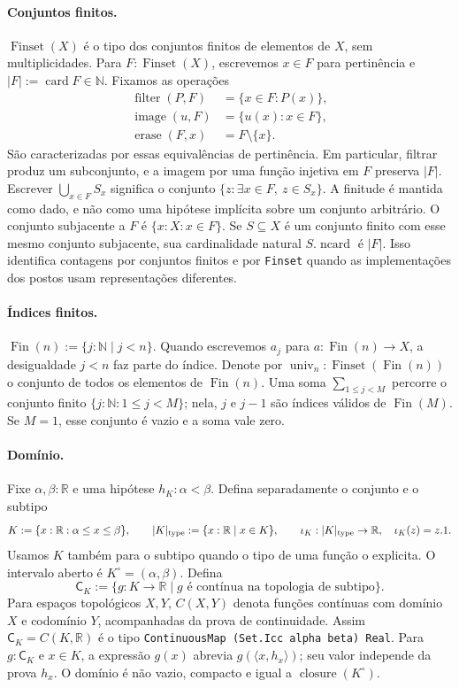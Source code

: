 \documentclass[11pt,a4paper]{article}
\newcommand{\N}{\mathbb N}
\newcommand{\R}{\mathbb R}
\newcommand{\CK}{\mathsf C_K}
\newcommand{\Fin}{\operatorname{Fin}}
\newcommand{\FS}{\operatorname{Finset}}
\newcommand{\card}{\operatorname{card}}
\newcommand{\cls}{\operatorname{closure}}
\newcommand{\code}[1]{\nolinkurl{#1}}
\begin{document}
\paragraph{Conjuntos finitos.}
$\FS(X)$ é o tipo dos conjuntos finitos de elementos de $X$, sem
multiplicidades. Para $F:\FS(X)$, escrevemos $x\in F$ para pertinência e
$|F|:=\card F\in\N$. Fixamos as operações
\begin{align*}
 \operatorname{filter}(P,F)&=\{x\in F:P(x)\},\\
 \operatorname{image}(u,F)&=\{u(x):x\in F\},\\
 \operatorname{erase}(F,x)&=F\setminus\{x\}.
\end{align*}
São caracterizadas por essas equivalências de pertinência. Em particular,
filtrar produz um subconjunto, e a imagem por uma função injetiva em $F$
preserva $|F|$. Escrever $\bigcup_{x\in F}S_x$ significa o conjunto
$\{z:\exists x\in F,\ z\in S_x\}$. A finitude é mantida como dado, e
não como uma hipótese implícita sobre um conjunto arbitrário.
O conjunto subjacente a $F$ é $\{x:X:x\in F\}$.
Se $S\subseteq X$ é um conjunto finito com esse mesmo conjunto
subjacente, sua cardinalidade natural $S.\operatorname{ncard}$ é $|F|$.
Isso identifica contagens por conjuntos finitos e por \code{Finset}
quando as implementações dos postos usam representações diferentes.

\paragraph{Índices finitos.}
$\Fin(n):=\{j:\N\mid j<n\}$. Quando escrevemos $a_j$ para
$a:\Fin(n)\to X$, a desigualdade $j<n$ faz parte do índice.
Denote por $\operatorname{univ}_n:\FS(\Fin(n))$ o conjunto de todos
os elementos de $\Fin(n)$. Uma soma $\sum_{1\le j<M}$ percorre o conjunto finito
$\{j:\N:1\le j<M\}$; nela, $j$ e $j-1$ são índices válidos de
$\Fin(M)$. Se $M=1$, esse conjunto é vazio e a soma vale zero.

\paragraph{Domínio.}
Fixe $\alpha,\beta:\R$ e uma hipótese $h_K:\alpha<\beta$.
Defina separadamente o conjunto e o subtipo
\[
 K:=\{x:\R:\alpha\le x\le\beta\},\qquad
 |K|_{\rm type}:=\{x:\R\mid x\in K\},\qquad
 \iota_K:|K|_{\rm type}\to\R,\quad\iota_K(z)=z.1.
\]
Usamos $K$ também para o subtipo quando o tipo de uma função o explicita.
O intervalo aberto é $K^\circ=(\alpha,\beta)$.
Defina
\[
 \CK:=\{g:K\to\R\mid g\text{ é contínua na topologia de subtipo}\}.
\]
Para espaços topológicos $X,Y$, $C(X,Y)$ denota funções contínuas
com domínio $X$ e codomínio $Y$, acompanhadas da prova de continuidade.
Assim $\CK=C(K,\R)$ é o tipo
\code{ContinuousMap (Set.Icc alpha beta) Real}. Para $g:\CK$ e $x\in K$, a expressão $g(x)$ abrevia
$g(\langle x,h_x\rangle)$; seu valor independe da prova $h_x$.
O domínio é não vazio, compacto e igual a $\cls(K^\circ)$.
\end{document}
